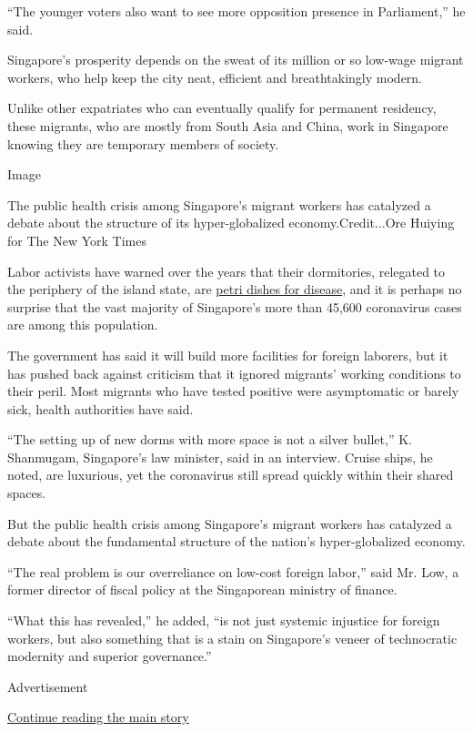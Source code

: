 ``The younger voters also want to see more opposition presence in
Parliament,'' he said.

Singapore's prosperity depends on the sweat of its million or so
low-wage migrant workers, who help keep the city neat, efficient and
breathtakingly modern.

Unlike other expatriates who can eventually qualify for permanent
residency, these migrants, who are mostly from South Asia and China,
work in Singapore knowing they are temporary members of society.

Image

The public health crisis among Singapore's migrant workers has catalyzed
a debate about the structure of its hyper-globalized
economy.Credit...Ore Huiying for The New York Times

Labor activists have warned over the years that their dormitories,
relegated to the periphery of the island state, are
\href{https://www.nytimes3xbfgragh.onion/2020/04/10/world/asia/coronavirus-migrants.html}{petri
dishes for disease}, and it is perhaps no surprise that the vast
majority of Singapore's more than 45,600 coronavirus cases are among
this population.

The government has said it will build more facilities for foreign
laborers, but it has pushed back against criticism that it ignored
migrants' working conditions to their peril. Most migrants who have
tested positive were asymptomatic or barely sick, health authorities
have said.

``The setting up of new dorms with more space is not a silver bullet,''
K. Shanmugam, Singapore's law minister, said in an interview. Cruise
ships, he noted, are luxurious, yet the coronavirus still spread quickly
within their shared spaces.

But the public health crisis among Singapore's migrant workers has
catalyzed a debate about the fundamental structure of the nation's
hyper-globalized economy.

``The real problem is our overreliance on low-cost foreign labor,'' said
Mr. Low, a former director of fiscal policy at the Singaporean ministry
of finance.

``What this has revealed,'' he added, ``is not just systemic injustice
for foreign workers, but also something that is a stain on Singapore's
veneer of technocratic modernity and superior governance.''

Advertisement

\protect\hyperlink{after-bottom}{Continue reading the main story}

